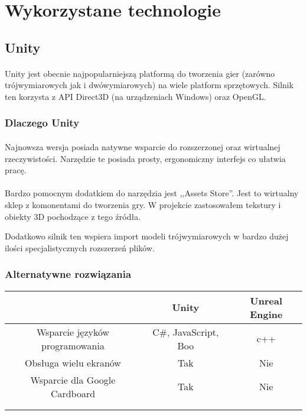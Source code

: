 \newpage
\section{Wykorzystane technologie}

\subsection{Unity}
\paragraph{}
Unity jest obecnie najpopularniejszą platformą do tworzenia gier (zarówno trójwymiarowych jak i dwówymiarowych) na wiele platform sprzętowych. Silnik ten korzysta z API Direct3D (na urządzeniach Windows) oraz OpenGL.
\subsubsection{Dlaczego Unity}
\paragraph{}
Najnowsza wersja posiada natywne wsparcie do rozszerzonej oraz wirtualnej rzeczywistości. Narzędzie te posiada prosty, ergonomiczny interfejs co ułatwia pracę.
\paragraph{}
Bardzo pomocnym dodatkiem do narzędzia jest ,,Assets Store''. Jest to wirtualny sklep z komonentami do tworzenia gry. W projekcie zastosowałem tekstury i obiekty 3D pochodzące z tego źródła.

Dodatkowo silnik ten wspiera import modeli trójwymiarowych w bardzo dużej ilości specjalistycznych rozszerzeń plików.

\subsubsection{Alternatywne rozwiązania}
 \begin{tabular}{|c|c|c|}
 \hline
 \ & Unity & Unreal Engine \\ 
  \hline
 Wsparcie języków programowania & C\#, JavaScript, Boo & c++ \\  
  \hline
 Obsługa wielu ekranów & Tak & Nie \\
 \hline  
  Wsparcie dla Google Cardboard & Tak & Nie \\
  \hline   
  &  &  \\
  \hline   
  &  &  \\
  \hline   
\end{tabular}

